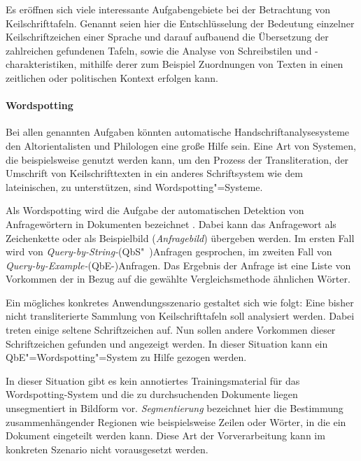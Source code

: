 Es eröffnen sich viele interessante Aufgabengebiete bei der Betrachtung von Keilschrifttafeln. Genannt seien hier 
die Entschlüsselung der Bedeutung einzelner Keilschriftzeichen einer Sprache und darauf aufbauend die 
Übersetzung der zahlreichen gefundenen Tafeln, sowie die Analyse von Schreibstilen und -charakteristiken,
mithilfe derer zum Beispiel Zuordnungen von Texten in einen zeitlichen oder politischen Kontext erfolgen kann.


\paragraph{Wordspotting}

Bei allen genannten Aufgaben könnten automatische Handschriftanalysesysteme den Altorientalisten und
Philologen eine große Hilfe sein. Eine Art von Systemen, die beispielsweise genutzt werden kann, um
den Prozess der Transliteration, der Umschrift von Keilschrifttexten in ein anderes Schriftsystem
wie dem lateinischen, zu unterstützen, sind Wordspotting"=Systeme.

Als Wordspotting wird die Aufgabe der automatischen Detektion von Anfragewörtern in Dokumenten bezeichnet
\cite{MHR}. Dabei kann das Anfragewort als Zeichenkette oder als Beispielbild (\emph{Anfragebild}) übergeben werden. Im ersten Fall wird von 
\emph{Query-by-String-}{(QbS"~)}Anfragen gesprochen, im zweiten Fall von \emph{Query-by-Example-}(QbE-)Anfragen. Das Ergebnis 
der Anfrage ist eine Liste von Vorkommen der in Bezug auf die gewählte Vergleichsmethode ähnlichen Wörter. 

Ein mögliches konkretes Anwendungsszenario gestaltet sich wie folgt: Eine bisher nicht transliterierte 
Sammlung von Keilschrifttafeln soll analysiert werden. Dabei treten  
einige seltene Schriftzeichen auf. Nun sollen andere Vorkommen dieser Schriftzeichen gefunden und
angezeigt werden. In dieser Situation kann ein QbE"=Wordspotting"=System zu Hilfe gezogen werden.

In dieser Situation gibt es kein annotiertes Trainingsmaterial für das Wordspotting-System und die
zu durchsuchenden Dokumente liegen unsegmentiert in Bildform vor. \emph{Segmentierung} bezeichnet hier die 
Bestimmung zusammenhängender Regionen wie beispielsweise Zeilen oder Wörter, in die ein Dokument eingeteilt werden kann. 
Diese Art der Vorverarbeitung kann im konkreten Szenario nicht vorausgesetzt werden.

